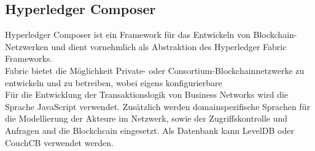 \subsection{Hyperledger Composer}
        Hyperledger Composer ist ein Framework für das Entwickeln von Blockchain-Netzwerken und dient vornehmlich als Abstraktion des Hyperledger Fabric Frameworks. 
        \medskip\\
        Fabric bietet die Möglichkeit Private- oder Consortium-Blockchainnetzwerke zu entwickeln und zu betreiben, wobei eigens konfigurierbare 
        \medskip\\
        \noindent Für die Entwicklung der Transaktionslogik von Business Networks wird die Sprache JavaScript verwendet. 
        Zusätzlich werden domainspezifische Sprachen für die Modellierung der Akteure im Netzwerk, sowie der Zugriffskontrolle und Anfragen and die Blockchcain eingesetzt.
        Als Datenbank kann LevelDB oder CouchCB verwendet werden. 
        
